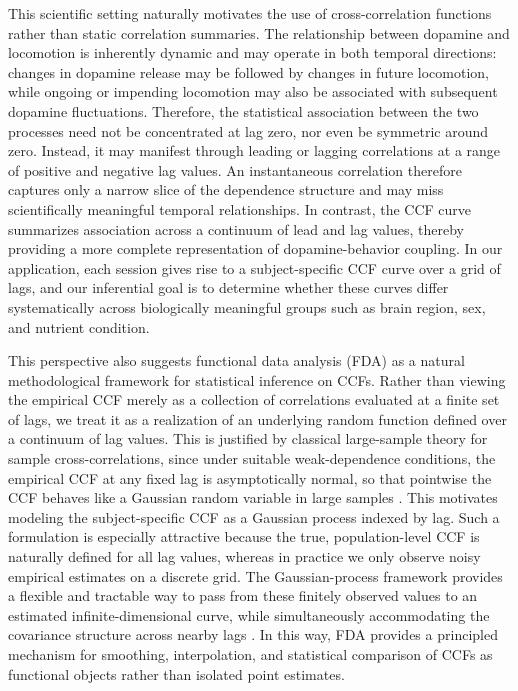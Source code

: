 \documentclass[12pt]{article}
\begin{document}
This scientific setting naturally motivates the use of cross-correlation functions rather than static correlation summaries. The relationship between dopamine and locomotion is inherently dynamic and may operate in both temporal directions: changes in dopamine release may be followed by changes in future locomotion, while ongoing or impending locomotion may also be associated with subsequent dopamine fluctuations. Therefore, the statistical association between the two processes need not be concentrated at lag zero, nor even be symmetric around zero. Instead, it may manifest through leading or lagging correlations at a range of positive and negative lag values. An instantaneous correlation therefore captures only a narrow slice of the dependence structure and may miss scientifically meaningful temporal relationships. In contrast, the CCF curve summarizes association across a continuum of lead and lag values, thereby providing a more complete representation of dopamine-behavior coupling. In our application, each session gives rise to a subject-specific CCF curve over a grid of lags, and our inferential goal is to determine whether these curves differ systematically across biologically meaningful groups such as brain region, sex, and nutrient condition.


This perspective also suggests functional data analysis (FDA) as a natural methodological framework for statistical inference on CCFs. Rather than viewing the empirical CCF merely as a collection of correlations evaluated at a finite set of lags, we treat it as a realization of an underlying random function defined over a continuum of lag values. This is justified by classical large-sample theory for sample cross-correlations, since under suitable weak-dependence conditions, the empirical CCF at any fixed lag is asymptotically normal, so that pointwise the CCF behaves like a Gaussian random variable in large samples \citep{shumway2006time}. This motivates modeling the subject-specific CCF as a Gaussian process indexed by lag. Such a formulation is especially attractive because the true, population-level CCF is naturally defined for all lag values, whereas in practice we only observe noisy empirical estimates on a discrete grid. The Gaussian-process framework provides a flexible and tractable way to pass from these finitely observed values to an estimated infinite-dimensional curve, while simultaneously accommodating the covariance structure across nearby lags \citep{suzuki2022gaussian,shi2011gaussian}. In this way, FDA provides a principled mechanism for smoothing, interpolation, and statistical comparison of CCFs as functional objects rather than isolated point estimates.
\end{document}
